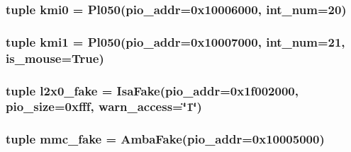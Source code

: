 \label{classRealView_1_1RealViewEB_ad5e65e2358629c72cc90cf5dc3bdb8ab}
\hypertarget{classRealView_1_1RealViewEB_a4fcef88eafab200d46609dff412add24}{
\subsubsection[{kmi0}]{\setlength{\rightskip}{0pt plus 5cm}tuple {\bf kmi0} = {\bf Pl050}(pio\_\-addr=0x10006000, int\_\-num=20)}}
\label{classRealView_1_1RealViewEB_a4fcef88eafab200d46609dff412add24}
\hypertarget{classRealView_1_1RealViewEB_ad2ff68a98564bfc794ffe30ecd80da6c}{
\subsubsection[{kmi1}]{\setlength{\rightskip}{0pt plus 5cm}tuple {\bf kmi1} = {\bf Pl050}(pio\_\-addr=0x10007000, int\_\-num=21, is\_\-mouse=True)}}
\label{classRealView_1_1RealViewEB_ad2ff68a98564bfc794ffe30ecd80da6c}
\hypertarget{classRealView_1_1RealViewEB_a58c42fcf23ff778110e667e2df1fbb6f}{
\subsubsection[{l2x0\_\-fake}]{\setlength{\rightskip}{0pt plus 5cm}tuple {\bf l2x0\_\-fake} = {\bf IsaFake}(pio\_\-addr=0x1f002000, pio\_\-size=0xfff, warn\_\-access=\char`\"{}1\char`\"{})}}
\label{classRealView_1_1RealViewEB_a58c42fcf23ff778110e667e2df1fbb6f}
\hypertarget{classRealView_1_1RealViewEB_aea1f4d5125bc4930882b7415e32696dc}{
\subsubsection[{mmc\_\-fake}]{\setlength{\rightskip}{0pt plus 5cm}tuple {\bf mmc\_\-fake} = {\bf AmbaFake}(pio\_\-addr=0x10005000)}}
